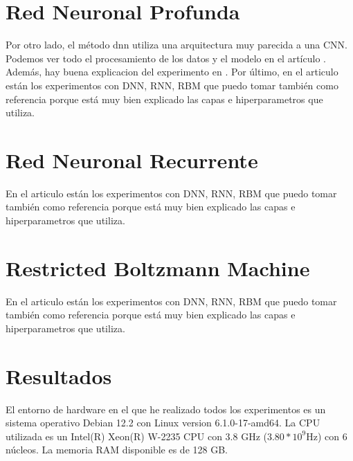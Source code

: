 \section{Red Neuronal Profunda}
Por otro lado, el método \gls{dnn} utiliza una arquitectura muy parecida a una CNN. Podemos ver todo el procesamiento de los datos y el modelo en el artículo \citep{maithem2021network}. Además, hay buena explicacion del experimento en \citep{vigneswaran2018evaluating}. Por último, en el articulo \citep{elmasry2019empirical} están los experimentos con DNN, RNN,  RBM que puedo tomar también como referencia porque está muy bien explicado las capas e hiperparametros que utiliza.

\section{Red Neuronal Recurrente}
En el articulo \citep{elmasry2019empirical} están los experimentos con DNN, RNN,  RBM que puedo tomar también como referencia porque está muy bien explicado las capas e hiperparametros que utiliza.

\section{Restricted Boltzmann Machine}
En el articulo \citep{elmasry2019empirical} están los experimentos con DNN, RNN,  RBM que puedo tomar también como referencia porque está muy bien explicado las capas e hiperparametros que utiliza.


\section{Resultados}
El entorno de hardware en el que he realizado todos los experimentos es un sistema operativo Debian 12.2 con Linux version 6.1.0-17-amd64. La CPU utilizada es un Intel(R) Xeon(R) W-2235 CPU con 3.8 GHz ($3.80*10^9$Hz) con 6 núcleos. La memoria RAM disponible es de 128 GB. 





